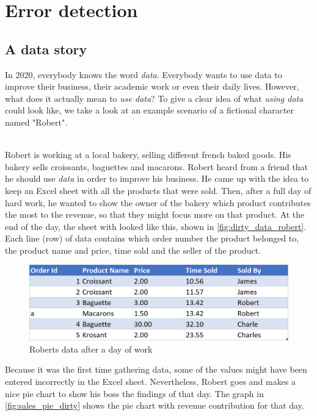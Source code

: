 \section{Error detection}
\label{sec:errordetection_intro}
\subsection{A data story}
\label{subsec:data_story}
In 2020, everybody knows the word \textit{data}. Everybody wants to use data to improve their business, their academic work or even their daily lives. However, what does it actually mean to \textit{use data}? To give a clear idea of what \textit{using data} could look like, we take a look at an example scenario of a fictional character named "Robert". 

~\\Robert is working at a local bakery, selling different french baked goods. His bakery sells croissants, baguettes and macarons. Robert heard from a friend that he should use \textit{data} in order to improve his business. He came up with the idea to keep an Excel sheet with all the products that were sold. Then, after a full day of hard work, he wanted to show the owner of the bakery which product contributes the most to the revenue, so that they might focus more on that product. 
At the end of the day, the sheet with looked like this, shown in \autoref{fig:dirty_data_robert}. Each line (row) of data contains which order number the product belonged to, the product name and price, time sold and the seller of the product.

\begin{figure}
    \centering
    \includegraphics[width=0.9\linewidth]{thesis/Figures/DirtyDataset.png}
    \caption{Roberts data after a day of work}
    \label{fig:dirty_data_robert}
\end{figure}

Because it was the first time gathering data, some of the values might have been entered incorrectly in the Excel sheet. Nevertheless, Robert goes and makes a nice pie chart to show his boss the findings of that day. The graph in \autoref{fig:sales_pie_dirty} shows the pie chart with revenue contribution for that day.

